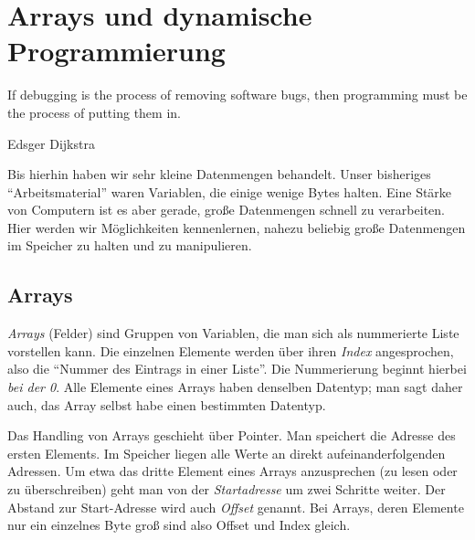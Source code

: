 \chapter{Arrays und dynamische Programmierung}
\epigraph{If debugging is the process of removing software bugs, then programming must be the process of putting them in.}
{Edsger Dijkstra}

Bis hierhin haben wir sehr kleine Datenmengen behandelt. Unser bisheriges \enquote{Arbeitsmaterial} waren Variablen, die einige wenige Bytes halten. Eine Stärke von Computern ist es aber gerade, große Datenmengen schnell zu verarbeiten. Hier werden wir Möglichkeiten kennenlernen, nahezu beliebig große Datenmengen im Speicher zu halten und zu manipulieren.

\section{Arrays} \label{sec:Arrays}
\emph{Arrays} (Felder) sind Gruppen von Variablen, die man sich als nummerierte Liste vorstellen kann. Die einzelnen Elemente werden über ihren \emph{Index} angesprochen, also die \enquote{Nummer des Eintrags in einer Liste}. Die Nummerierung beginnt hierbei \emph{bei der 0}. Alle Elemente eines Arrays haben denselben Datentyp; man sagt daher auch, das Array selbst habe einen bestimmten Datentyp.

Das Handling von Arrays geschieht über Pointer. Man speichert die Adresse des ersten Elements. Im Speicher liegen alle Werte an direkt aufeinanderfolgenden Adressen. Um etwa das dritte Element eines Arrays anzusprechen (zu lesen oder zu überschreiben) geht man von der \emph{Startadresse} um zwei Schritte weiter. Der Abstand zur Start-Adresse wird auch \emph{Offset} genannt. Bei Arrays, deren Elemente nur ein einzelnes Byte groß sind also Offset und Index gleich.

